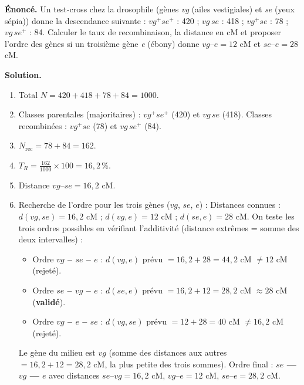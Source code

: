 \documentclass[11pt]{article}
\begin{document}
\begin{exoresolu}
\textbf{Énoncé.} Un test‑cross chez la drosophile (gènes \emph{vg} (ailes vestigiales) et \emph{se} (yeux sépia)) donne la descendance suivante :  
$vg^+ se^+$ : 420 ; $vg\,se$ : 418 ; $vg^+ se$ : 78 ; $vg\,se^+$ : 84.  
Calculer le taux de recombinaison, la distance en cM et proposer l’ordre des gènes si un troisième gène \emph{e} (ébony) donne $vg$–$e = 12$ cM et $se$–$e = 28$ cM.

\tcblower

\textbf{Solution.}
\begin{enumerate}
\item Total $N = 420+418+78+84 = 1000$.
\item Classes parentales (majoritaires) : $vg^+ se^+$ (420) et $vg\,se$ (418).  
  Classes recombinées : $vg^+ se$ (78) et $vg\,se^+$ (84).
\item $N_{\text{rec}} = 78+84 = 162$.
\item $T_R = \frac{162}{1000}\times 100 = 16,2\,\%$.
\item Distance $vg$–$se = 16,2 \text{ cM}$.
\item Recherche de l'ordre pour les trois gènes ($vg$, $se$, $e$) :  
  Distances connues : $d(vg, se) = 16,2$ cM ; $d(vg, e) = 12$ cM ; $d(se, e) = 28$ cM.  
  On teste les trois ordres possibles en vérifiant l'additivité (distance extrêmes = somme des deux intervalles) :
  \begin{itemize}
  \item Ordre \textbf{$vg$ – $se$ – $e$} : $d(vg,e)$ prévu $= 16,2 + 28 = 44,2$ cM $\neq 12$ cM (rejeté).
  \item Ordre \textbf{$se$ – $vg$ – $e$} : $d(se,e)$ prévu $= 16,2 + 12 = 28,2$ cM $\approx 28$ cM (\textbf{validé}).
  \item Ordre \textbf{$vg$ – $e$ – $se$} : $d(vg,se)$ prévu $= 12 + 28 = 40$ cM $\neq 16,2$ cM (rejeté).
  \end{itemize}
  Le gène du milieu est \textbf{$vg$} (somme des distances aux autres $= 16,2 + 12 = 28,2$ cM, la plus petite des trois sommes).  
  Ordre final : \textbf{$se$ — $vg$ — $e$} avec distances $se$–$vg = 16,2$ cM, $vg$–$e = 12$ cM, $se$–$e = 28,2$ cM.
\end{enumerate}
\end{exoresolu}
\end{document}

